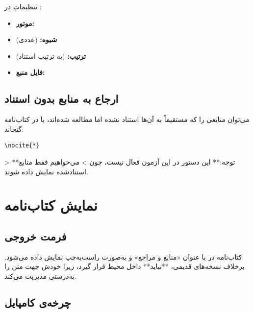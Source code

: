 \documentclass{matinbook}
\begin{document}
تنظیمات  در :

\begin{itemize}
    \item \textbf{موتور:} 
    \item \textbf{شیوه:}  (عددی)
    \item \textbf{ترتیب:}  (به ترتیب استناد)
    \item \textbf{فایل منبع:} 
\end{itemize}

\section{ارجاع به منابع بدون استناد}
\label{sec:citation-nocite}

می‌توان منابعی را که مستقیماً به آن‌ها استناد نشده
اما مطالعه شده‌اند، با 
در کتاب‌نامه گنجاند:

\begin{latin}
\begin{verbatim}
\nocite{*}
\end{verbatim}
\end{latin}

> **توجه:** این دستور در این آزمون فعال نیست، چون
> می‌خواهیم فقط منابع استنادشده نمایش داده شوند.

\chapter{نمایش کتاب‌نامه}
\label{chap:bibliography-display}

\section{فرمت خروجی}
\label{sec:bibliography-format}

کتاب‌نامه در  با عنوان «منابع و مراجع»
و به‌صورت راست‌به‌چپ نمایش داده می‌شود. برخلاف نسخه‌های
قدیمی،  **نباید**
داخل محیط  قرار گیرد، زیرا 
خودش جهت متن را به‌درستی مدیریت می‌کند.


\section{چرخه‌ی کامپایل}
\label{sec:bibliography-compile}
\end{document}
